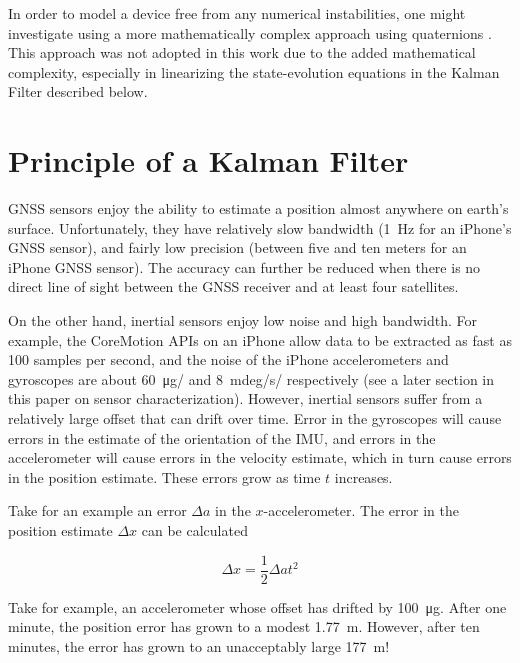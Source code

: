 \documentclass[10pt]{article}
\begin{document}
In order to model a device free from any numerical instabilities, one might investigate using a more mathematically complex approach using quaternions \cite{quaternion1, quaternion2}. This approach was not adopted in this work due to the added mathematical complexity, especially in linearizing the state-evolution equations in the Kalman Filter described below.

\section{Principle of a Kalman Filter}

GNSS sensors enjoy the ability to estimate a position almost anywhere on earth's surface. Unfortunately, they have relatively slow bandwidth (\SI{1}{Hz} for an iPhone's GNSS sensor), and fairly low precision (between five and ten meters for an iPhone GNSS sensor). The accuracy can further be reduced when there is no direct line of sight between the GNSS receiver and at least four satellites.

On the other hand, inertial sensors enjoy low noise and high bandwidth. For example, the CoreMotion APIs on an iPhone allow data to be extracted as fast as 100 samples per second, and the noise of the iPhone accelerometers and gyroscopes are about \SI{60}{\micro g/} and \SI{8}{mdeg/s/} respectively (see a later section in this paper on sensor characterization). However, inertial sensors suffer from a relatively large offset that can drift over time. Error in the gyroscopes will cause errors in the estimate of the orientation of the IMU, and errors in the accelerometer will cause errors in the velocity estimate, which in turn cause errors in the position estimate. These errors grow as time $t$ increases. 

Take for an example an error $\Delta a$ in the $x$-accelerometer. The error in the position estimate $\Delta x$ can be calculated

\begin{equation}
\Delta x = \frac{1}{2}\Delta a t^2
\end{equation}

Take for example, an accelerometer whose offset has drifted by \SI{100}{\micro g}. After one minute, the position error has grown to a modest \SI{1.77}{m}. However, after ten minutes, the error has grown to an unacceptably large \SI{177}{m}!
\end{document}
